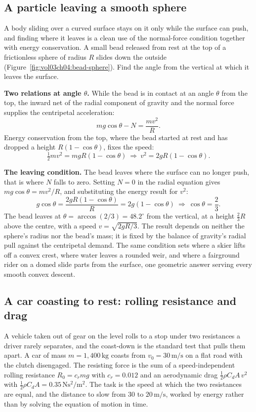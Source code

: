 \subsection{A particle leaving a smooth sphere}

A body sliding over a curved surface stays on it only while the surface
can push, and finding where it leaves is a clean use of the normal-force
condition together with energy conservation. A small bead released from
rest at the top of a frictionless sphere of radius $R$ slides down the
outside (Figure~\ref{fig:vol03ch04:bead-sphere}). Find the angle from
the vertical at which it leaves the surface.

\textbf{Two relations at angle $\theta$.} While the bead is in contact
at an angle $\theta$ from the top, the inward net of the radial
component of gravity and the normal force supplies the centripetal
acceleration:
\[
mg\cos\theta-N=\frac{mv^{2}}{R}.
\]
Energy conservation from the top, where the bead started at rest and has
dropped a height $R(1-\cos\theta)$, fixes the speed:
\[
\tfrac{1}{2}mv^{2}=mgR(1-\cos\theta)
\ \Rightarrow\
v^{2}=2gR(1-\cos\theta).
\]

\textbf{The leaving condition.} The bead leaves where the surface can no
longer push, that is where $N$ falls to zero. Setting $N=0$ in the
radial equation gives $mg\cos\theta=mv^{2}/R$, and substituting the
energy result for $v^{2}$:
\[
g\cos\theta=\frac{2gR(1-\cos\theta)}{R}=2g(1-\cos\theta)
\ \Rightarrow\
\cos\theta=\frac{2}{3}.
\]
The bead leaves at $\theta=\arccos(2/3)=48.2^{\circ}$ from the vertical,
at a height $\tfrac{2}{3}R$ above the centre, with a speed $v=\sqrt{2gR/
3}$. The result depends on neither the sphere's radius nor the bead's
mass; it is fixed by the balance of gravity's radial pull against the
centripetal demand. The same condition sets where a skier lifts off a
convex crest, where water leaves a rounded weir, and where a fairground
rider on a domed slide parts from the surface, one geometric answer
serving every smooth convex descent.



\subsection{A car coasting to rest: rolling resistance and drag}

A vehicle taken out of gear on the level rolls to a stop under two
resistances a driver rarely separates, and the coast-down is the
standard test that pulls them apart. A car of mass $m=1{,}400\,\si{
\kilogram}$ coasts from $v_{0}=30\,\si{\meter\per\second}$ on a flat
road with the clutch disengaged. The resisting force is the sum of a
speed-independent rolling resistance $R_{0}=c_{r}mg$ with $c_{r}=0.012$
and an aerodynamic drag $\tfrac{1}{2}\rho C_{d}A\,v^{2}$ with
$\tfrac{1}{2}\rho C_{d}A=0.35\,\si{\newton\second\squared\per\meter
\squared}$. The task is the speed at which the two resistances are
equal, and the distance to slow from $30$ to $20\,\si{\meter\per
\second}$, worked by energy rather than by solving the equation of
motion in time.

